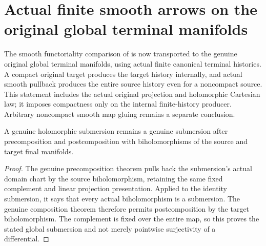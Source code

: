 \section{Actual finite smooth arrows on the original global terminal manifolds}

The smooth functoriality comparison of
\cite{bierstone-milman08-functoriality,wlodarczyk05-hironaka}
is now transported to the genuine original global terminal manifolds,
using actual finite canonical terminal histories. A compact original target
produces the target history internally, and actual smooth pullback produces
the entire source history even for a noncompact source. This statement includes the actual
original projection and holomorphic Cartesian law; it imposes compactness
only on the internal finite-history producer. Arbitrary noncompact smooth
map gluing remains a separate conclusion.

\begin{lemma}
\label{hir:original-global-finite-submersion-biholomorphic-transport}
\leanok
{}
A genuine holomorphic submersion remains a genuine submersion after
precomposition and postcomposition with biholomorphisms of the source
and target final manifolds.
\end{lemma}
\begin{proof}
The genuine precomposition theorem pulls back the submersion's actual
domain chart by the source biholomorphism, retaining the same fixed
complement and linear projection presentation. Applied to the identity
submersion, it says that every actual biholomorphism is a submersion.
The genuine composition theorem therefore permits postcomposition by
the target biholomorphism. The complement is fixed over the entire map,
so this proves the stated global submersion and not merely pointwise
surjectivity of a differential.
\end{proof}


